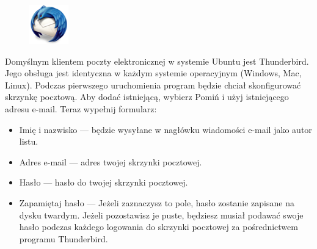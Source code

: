 \begin{figure}
	\vspace{-10pt}
	\includegraphics[width=\linewidth]{images/ikony_thunderbird.png}
\end{figure}

Domyślnym klientem poczty elektronicznej w systemie Ubuntu jest Thunderbird. Jego obsługa jest identyczna w każdym systemie operacyjnym (Windows, Mac, Linux). Podczas pierwszego uruchomienia program będzie chciał skonfigurować skrzynkę pocztową. Aby dodać istniejącą, wybierz \textcolor{ubuntu_orange}{Pomiń i użyj istniejącego adresu e-mail}. Teraz wypełnij formularz:
\begin{itemize}
\item \textcolor{ubuntu_orange}{Imię i nazwisko} --- będzie wysyłane w nagłówku wiadomości e-mail jako autor listu.
\item \textcolor{ubuntu_orange}{Adres e-mail} --- adres twojej skrzynki pocztowej.
\item \textcolor{ubuntu_orange}{Hasło} --- hasło do twojej skrzynki pocztowej.
\item \textcolor{ubuntu_orange}{Zapamiętaj hasło} --- Jeżeli zaznaczysz to pole, hasło zostanie zapisane na dysku twardym. Jeżeli pozostawisz je puste, będziesz musiał podawać swoje hasło podczas każdego logowania do skrzynki pocztowej za pośrednictwem programu Thunderbird.
\end{itemize}

